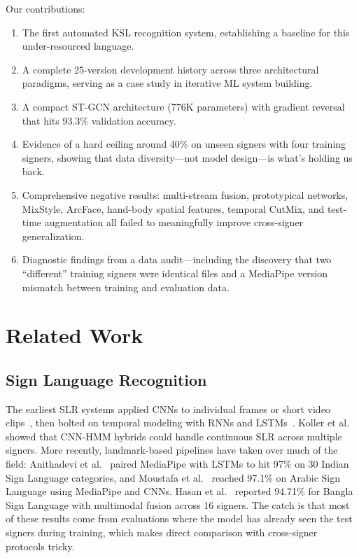 \documentclass[conference]{IEEEtran}
\begin{document}
Our contributions:
\begin{enumerate}
    \item The first automated KSL recognition system, establishing a baseline for this under-resourced language.
    \item A complete 25-version development history across three architectural paradigms, serving as a case study in iterative ML system building.
    \item A compact ST-GCN architecture (776K parameters) with gradient reversal that hits 93.3\% validation accuracy.
    \item Evidence of a hard ceiling around 40\% on unseen signers with four training signers, showing that data diversity---not model design---is what's holding us back.
    \item Comprehensive negative results: multi-stream fusion, prototypical networks, MixStyle, ArcFace, hand-body spatial features, temporal CutMix, and test-time augmentation all failed to meaningfully improve cross-signer generalization.
    \item Diagnostic findings from a data audit---including the discovery that two ``different'' training signers were identical files and a MediaPipe version mismatch between training and evaluation data.
\end{enumerate}

\section{Related Work}

\subsection{Sign Language Recognition}

The earliest SLR systems applied CNNs to individual frames or short video clips~\cite{pigou2015, oyedotun2017}, then bolted on temporal modeling with RNNs and LSTMs~\cite{hochreiter1997, huang2022}. Koller et al.~\cite{koller2015} showed that CNN-HMM hybrids could handle continuous SLR across multiple signers. More recently, landmark-based pipelines have taken over much of the field: Anithadevi et al.~\cite{anithadevi2025} paired MediaPipe with LSTMs to hit 97\% on 30 Indian Sign Language categories, and Moustafa et al.~\cite{moustafa2023} reached 97.1\% on Arabic Sign Language using MediaPipe and CNNs. Hasan et al.~\cite{hasan2025} reported 94.71\% for Bangla Sign Language with multimodal fusion across 16 signers. The catch is that most of these results come from evaluations where the model has already seen the test signers during training, which makes direct comparison with cross-signer protocols tricky.
\end{document}

